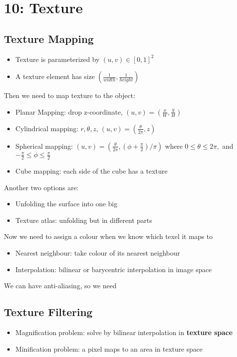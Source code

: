 \documentclass[a4paper]{article}
\begin{document}
\section{10: Texture}
\subsection*{Texture Mapping}
\begin{itemize}
    \item Texture is parameterized by $(u,v) \in [0,1]^2$
    \item A texture element has size $(\frac{1}{width}, \frac{1}{height})$
\end{itemize}
Then we need to map texture to the object:
\begin{itemize}
    \item Planar Mapping: drop z-coordinate, $(u,v) = (\frac{x}{W}, \frac{y}{H})$ 
    \item Cylindrical mapping: $r, \theta, z$, $(u,v) = (\frac{\theta}{2\pi}, z)$  
    \item Spherical mapping: $(u,v) = (\frac{\theta}{2\pi}, (\phi + \frac{\pi}{2})/\pi)$ where $0 \leq \theta \leq 2\pi,$ and $-\frac{\pi}{2} \leq \phi \leq \frac{\pi}{2}$
    \item Cube mapping: each side of the cube has a texture  
\end{itemize}

Another two options are:
\begin{itemize}
    \item Unfolding the surface into one big
    \item Texture atlas: unfolding but in different parts

\end{itemize}
Now we need to assign a colour when we know which texel it maps to
\begin{itemize}
    \item Nearest neighbour: take colour of its nearest neighbour
    \item Interpolation: bilinear or barycentric interpolation in image space
\end{itemize}

We can have anti-aliasing, so we need 
\subsection*{Texture Filtering}
\begin{itemize}
    \item Magnification problem: solve by bilinear interpolation in \textbf{texture space} 
    \item Minification problem: a pixel maps to an area in texture space 
\end{itemize}
\end{document}
